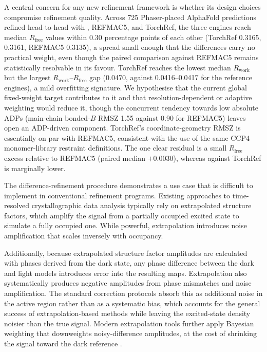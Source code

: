 \documentclass{iucrjournals}
\begin{document}
A central concern for any new refinement framework is whether its design
choices compromise refinement quality. Across 725 Phaser-placed
AlphaFold predictions refined head-to-head with ,
REFMAC5, and TorchRef, the three engines reach median $R_\mathrm{free}$ values
within 0.30 percentage points of each other
(TorchRef \num{0.3165},  \num{0.3161}, REFMAC5 \num{0.3135}),
a spread small enough that the differences carry no practical weight, even though
the paired comparison against REFMAC5 remains statistically resolvable in its favour.
TorchRef reaches the lowest median $R_\mathrm{work}$ but the largest
$R_\mathrm{work}$--$R_\mathrm{free}$ gap (\num{0.0470}, against
\num{0.0416}--\num{0.0417} for the reference engines), a mild overfitting
signature.  We hypothesise that the current global fixed-weight target contributes
to it and that resolution-dependent or adaptive weighting would reduce it, though the
concurrent tendency towards low absolute ADPs (main-chain bonded-$B$ RMSZ \num{1.55}
against \num{0.90} for REFMAC5) leaves open an ADP-driven component.  TorchRef's
coordinate-geometry RMSZ is essentially on par with REFMAC5, consistent with the
use of the same CCP4 monomer-library restraint definitions.  The one clear
residual is a small $R_\mathrm{free}$ excess relative to REFMAC5 (paired median
$+0.0030$), whereas against  TorchRef is marginally lower.


The difference-refinement procedure demonstrates a use case that is difficult
to implement in conventional refinement programs.
Existing approaches to time-resolved crystallographic data analysis typically
rely on extrapolated structure factors, which amplify the signal from a partially
occupied excited state to simulate a fully occupied one.
While powerful, extrapolation introduces noise amplification that scales
inversely with occupancy.

Additionally, because extrapolated structure factor amplitudes are calculated
with phases derived from the dark state, any phase difference between the dark
and light models introduces error into the resulting maps.
Extrapolation also systematically produces negative amplitudes from phase
mismatches and noise amplification.
The standard correction protocols absorb this as additional noise in the
active region rather than as a systematic bias, which accounts for the
general success of extrapolation-based methods while leaving the
excited-state density noisier than the true signal.
Modern extrapolation tools further apply Bayesian weighting that downweights
noisy-difference amplitudes, at the cost of shrinking the signal toward
the dark reference \cite{de_zitter_xtrapol8_2022}.
\end{document}
